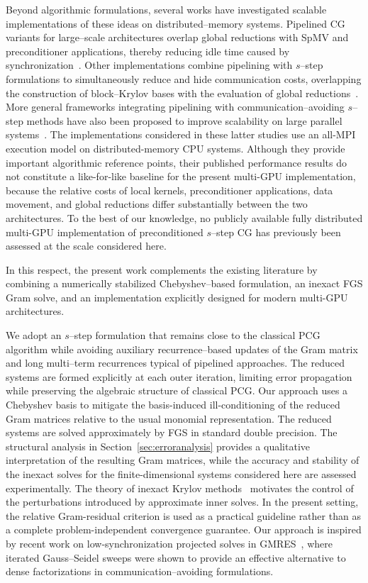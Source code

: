 \documentclass[pdflatex,sn-mathphys-num]{sn-jnl}%
\begin{document}
Beyond algorithmic formulations, several works have investigated scalable implementations of these ideas on distributed--memory systems. Pipelined CG variants for large--scale architectures overlap global reductions with SpMV and preconditioner applications, thereby reducing idle time caused by synchronization~\cite{tiwari2022pipepcg}. Other implementations combine pipelining with $s$--step formulations to simultaneously reduce and hide communication costs, overlapping the construction of block--Krylov bases with the evaluation of global reductions~\cite{Tiwari2021}. More general frameworks integrating pipelining with communication--avoiding $s$--step methods have also been proposed to improve scalability on large parallel systems~\cite{MG2025,mayer2026pspcg}.
The implementations considered in these latter studies use an
all-MPI execution model on distributed-memory CPU systems. Although
they provide important algorithmic reference points, their published
performance results do not constitute a like-for-like baseline for
the present multi-GPU implementation, because the relative costs of
local kernels, preconditioner applications, data movement, and global
reductions differ substantially between the two architectures.
To the best of our knowledge, no publicly available fully distributed
multi-GPU implementation of preconditioned $s$--step CG has previously
been assessed at the scale considered here.

In this respect, the present work complements the existing literature
by combining a numerically stabilized Chebyshev--based formulation, an
inexact FGS Gram solve, and an implementation explicitly designed for
modern multi-GPU architectures.

We adopt an $s$--step formulation that remains close to the classical PCG algorithm while avoiding auxiliary recurrence--based updates of the Gram matrix and long multi--term recurrences typical of pipelined approaches. The reduced systems are formed explicitly at each outer iteration, limiting error propagation while preserving the algebraic structure of classical PCG. Our approach uses a Chebyshev basis to mitigate the
basis-induced ill-conditioning of the reduced Gram matrices relative
to the usual monomial representation. The reduced systems are solved
approximately by FGS in standard double precision. The structural
analysis in Section~\ref{sec:erroranalysis} provides a qualitative
interpretation of the resulting Gram matrices, while the accuracy and
stability of the inexact solves for the finite-dimensional systems
considered here are assessed experimentally.
The theory of inexact Krylov methods~\cite{vandenEshofSleijpen2004,bouras2005}
motivates the control of the perturbations introduced by approximate
inner solves. In the present setting, the relative Gram-residual
criterion is used as a practical guideline rather than as a complete
problem-independent convergence guarantee.
Our approach is inspired by recent work on low-synchronization projected solves in GMRES~\cite{Thomas2024IGSGMRES}, where iterated Gauss--Seidel sweeps were shown to provide an effective alternative to dense factorizations in communication--avoiding formulations.
\end{document}
